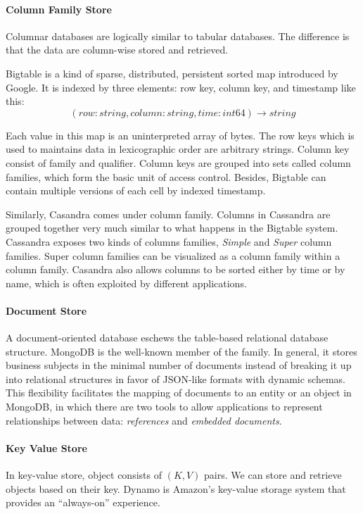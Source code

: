 \documentclass[letter,twocolumn]{article}
\begin{document}
\paragraph*{Column Family Store}
Columnar databases are logically similar to tabular databases. The difference is that the data are  column-wise stored and retrieved.

Bigtable\citep{Chang2006} is a kind of sparse, distributed, persistent sorted map introduced by Google. It is indexed by three elements: row key, column key, and timestamp like this:
\[ (row:string, column:string, time:int64) \rightarrow string \]

Each value in this map is an uninterpreted array of bytes. The row keys which is used to maintains data in lexicographic order are arbitrary strings. Column key consist of family and qualifier. Column keys are grouped into sets called column families, which form the basic unit of access control. Besides, Bigtable can contain multiple versions of each cell by indexed timestamp.

Similarly, Casandra comes under column family. Columns in Cassandra are grouped together very much similar to what happens in the Bigtable system. Cassandra\citep{LakshamAvinash2010} exposes two kinds of columns families, \textit{Simple} and \textit{Super} column families. Super column families can be visualized as a column family within a column family. Casandra also allows columns to be sorted either by time or by name, which is often exploited by different applications.

\paragraph*{Document Store}
A document-oriented database eschews the table-based relational database structure. MongoDB is the well-known member of the family. In general, it stores business subjects in the minimal number of documents instead of breaking it up into relational structures\citep{Hoberman2014} in favor of JSON-like formats with dynamic schemas.\citep{Suter2012} This flexibility facilitates the mapping of documents to an entity or an object in MongoDB, in which there are two tools to allow applications to represent relationships between data: \textit{references} and \textit{embedded documents}.\citep{MongoDBInc.2009}

\paragraph*{Key Value Store}
In key-value store, object consists of $(K, V)$ pairs. We can store and retrieve objects based on their key. Dynamo is Amazon's key-value storage system that provides an ``always-on'' experience. 
\end{document}
